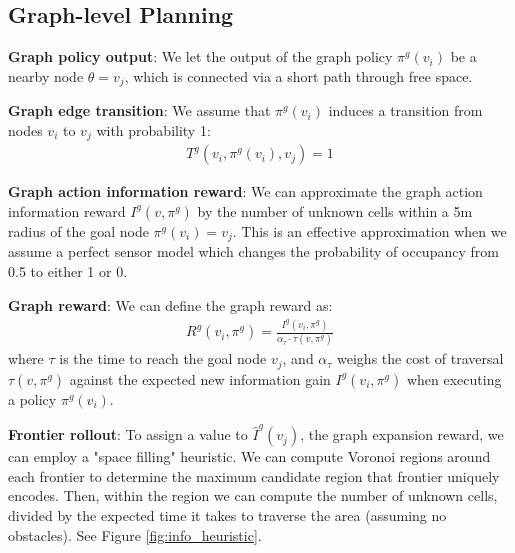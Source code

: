 \documentclass[letterpaper, 10 pt, conference]{ieeeconf}  %
\newcommand{\ph}[1]{{\textbf{#1}:}} %
\begin{document}
\subsection{Graph-level Planning}


\ph{Graph policy output}
We let the output of the graph policy $\pi^g(v_i)$ be a nearby node $\theta=v_j$, which is connected via a short path through free space.

\ph{Graph edge transition}
We assume that $\pi^{g}(v_i)$ induces a  transition from nodes $v_i$ to $v_j$ with probability 1:
\begin{align}
    T^{g} (v_i, \pi^g(v_i), v_j) = 1
\end{align}

\ph{Graph action information reward}
We can approximate the graph action information reward $I^g(v, \pi^g)$ by the number of unknown cells within a 5m radius of the goal node $\pi^g(v_i)=v_j$.  This is an effective approximation when we assume a perfect sensor model which changes the probability of occupancy from 0.5 to either 1 or 0.  

\ph{Graph reward}
We can define the graph reward as:
\begin{align}
    R^g(v_i, \pi^g) = \frac{I^g(v_i,\pi^g)}{\alpha_\tau \cdot \tau(v,\pi^g)}
\end{align}
where $\tau$ is the time to reach the goal node $v_j$, and $\alpha_\tau$ weighs the cost of traversal $\tau(v,\pi^g)$ against the expected new information gain $I^g(v_i,\pi^g)$ when executing a policy $\pi^g(v_i)$.  

\ph{Frontier rollout}
To assign a value to $\hat{I}^{g}(v_j)$, the graph expansion reward, we can employ a "space filling" heuristic.  We can compute Voronoi regions around each frontier to determine the maximum candidate region that frontier uniquely encodes.  Then, within the region we can compute the number of unknown cells, divided by the expected time it takes to traverse the area (assuming no obstacles).  See Figure \ref{fig:info_heuristic}.
\end{document}
